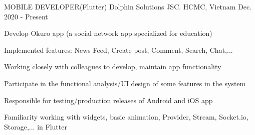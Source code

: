 

\begin{cventries}

  \cventry
    {MOBILE DEVELOPER{\enskip\cdotp\enskip}(Flutter)} %
    {Dolphin Solutions JSC.} %
    {HCMC, Vietnam} %
    {Dec. 2020 - Present} %
    {
      \begin{cvitems} %
        \item {Develop Okuro app (a social network app specialized for education)}
        \item {Implemented features: News Feed, Create post, Comment, Search, Chat,...}
        \item {Working closely with colleagues to develop, maintain app functionality}
        \item {Participate in the functional analysis/UI design of some features in the system}
        \item {Responsible for testing/production releases of Android and iOS app}
        \item {Familiarity working with widgets, basic animation, Provider, Stream, Socket.io, Storage,... in Flutter}
      \end{cvitems}
    }

\end{cventries}
